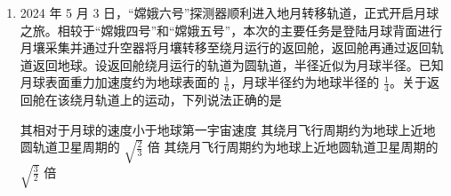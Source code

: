 \documentclass[\gkver]{gaokaozhenti}
\begin{document}
\begin{enumerate}
{

转子在磁场中转动时产生的电动势为 $e = NBS\omega\sin\omega t$

A．当转子角速度增加一倍时，升压变压器原副线圈两端电压都增加一倍，输电线上的电流变为 $I_{2}' = 2I_{2}$，故 $R_{0}$ 上消耗的电功率变为原来的 4 倍，故 A 正确；

C．升压变压器副线圈匝数增加一倍，副线圈两端电压增加一倍，输电线上的电流增加一倍，故 $R_{0}$ 上消耗的电功率变为原来的 4 倍，故 C 错误；

B．若 $R_{0}$ 阻值增加一倍，输电线路上的电流 $I_{2}'' = \frac{U_{2}}{2R_{0} + k^{2}R}$

$R_{0}$ 消耗的功率 $P_{3} = I_{2}''^{2} \cdot 2R_{0} \neq 4P$，故 B 错误；

D．若在用户端并联一个完全相同的电阻 $R$，用户端电阻减为原来的一半，输电线上的电流为 $I_{2}'' = \frac{U_{2}}{R_{0} + \frac{k^{2}R}{2}} = \frac{2U_{2}}{2R_{0} + k^{2}R}$

$R_{0}$ 消耗的功率 $P_{4}=I_{2}''^{2}R_{0}\neq6P$，故 D 错误。

故选 A。
}

\item
2024 年 5 月 3 日，“嫦娥六号”探测器顺利进入地月转移轨道，正式开启月球之旅。相较于“嫦娥四号”和“嫦娥五号”，本次的主要任务是登陆月球背面进行月壤采集并通过升空器将月壤转移至绕月运行的返回舱，返回舱再通过返回轨道返回地球。设返回舱绕月运行的轨道为圆轨道，半径近似为月球半径。已知月球表面重力加速度约为地球表面的 $\frac{1}{6}$，月球半径约为地球半径的 $\frac{1}{4}$。关于返回舱在该绕月轨道上的运动，下列说法正确的是

{其相对于月球的速度小于地球第一宇宙速度}
{其绕月飞行周期约为地球上近地圆轨道卫星周期的 $\sqrt{\frac{2}{3}}$ 倍}
{其绕月飞行周期约为地球上近地圆轨道卫星周期的 $\sqrt{\frac{3}{2}}$ 倍}

\end{enumerate}
\end{document}

